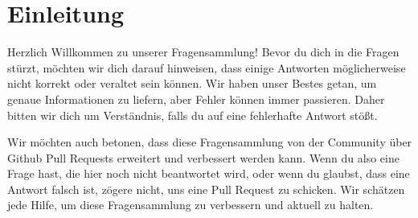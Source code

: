 \section{Einleitung}
Herzlich Willkommen zu unserer Fragensammlung! Bevor du dich in die Fragen stürzt, möchten wir dich darauf hinweisen, 
dass einige Antworten möglicherweise nicht korrekt oder veraltet sein können. 
Wir haben unser Bestes getan, um genaue Informationen zu liefern, aber Fehler können immer passieren. 
Daher bitten wir dich um Verständnis, falls du auf eine fehlerhafte Antwort stößt.

Wir möchten auch betonen, dass diese Fragensammlung von der Community über Github Pull Requests erweitert
und verbessert werden kann. Wenn du also eine Frage hast, die hier noch nicht beantwortet wird, oder wenn du glaubst, 
dass eine Antwort falsch ist, zögere nicht, uns eine Pull Request zu schicken. Wir schätzen jede Hilfe, um diese Fragensammlung zu verbessern und aktuell zu halten.